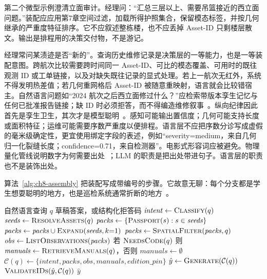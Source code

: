 第二个微型示例澄清立面审计。经理问：``汇总三层以上、需要吊篮接近的西立面问题。''装配应应用第7章空间过滤，加载所得护照集合，保留模态标签，并按几何继承的严重度特征排序。它不应叙述整栋楼，也不应丢掉 Asset-ID 只剩楼层散文。输出是排程用的决策交付物，不是游记。



经理常问某渍迹是否``新的''。查询历史维修记录是决策层的一等能力，也是一等装配意图。跨航次比较需要跨时间同一 Asset-ID、可比的模态覆盖、可用时的既往观测 ID 或工单链接，以及对缺失既往记录的显式处理。若上一航次无红外，系统不得发明热差值；若几何重网格后 Asset-ID 被随意重映射，语言就会比较错宿主。自然语言问题如``2024 航次之后西立面修过什么？''应检索带版本孪生记忆与任何已批准报告链接；缺 ID 时必须拒答，而不得编造维修叙事~\cite{zhang2025,yang2025detreconreg,chen2023facility}。纵向纪律因此首先是孪生卫生，其次才是模型聪明~\cite{zhang2025,yang2025detreconreg,zhao2026physical}。感知可能输出置信度；几何可能支持长度或面积特征；运维可能需要序数严重度以便排程。语言层不应把序数分诊写成虚假的毫米级确定性，更宜使用绑定字段的表述，例如``severity=medium，来自几何归一化裂缝长度；confidence=0.71，来自检测器''。电影式形容词应被避免。物理量化管线说明数字为何需要出处~\cite{zhao2024facade,zhao2026physical}；LLM 的职责是把出处带进句子。语言层的职责也不是装饰出处。

算法~\ref{alg:ch8-assembly} 把装配写成带编号的步骤。它故意无聊：每个分支都是学生想耍聪明的地方，也是巡检系统通常折断的地方~\cite{lewis2020,peng2024,jeon2025hybridrag}。

\begin{algorithm}[htbp]
\caption{面向接地巡检答案的意图条件孪生装配。}
\label{alg:ch8-assembly}
\begin{algorithmic}[1]
\Require 自然语言查询 $q$
\Ensure 草稿答案，或结构化拒答码
\State $\mathit{intent} \gets \textsc{Classify}(q)$
\State $\mathit{seeds} \gets \textsc{ResolveAssets}(q)$ 
\State $\mathit{packs} \gets \{\textsc{Passport}(s): s\in\mathit{seeds}\}$
  \State $\mathit{packs} \gets \mathit{packs}\cup\textsc{Expand}(\mathit{seeds},k{=}1)$
\EndIf
{}
  \State $\mathit{packs} \gets \textsc{SpatialFilter}(\mathit{packs},q)$
\EndIf
\State $\mathit{obs} \gets \textsc{ListObservations}(\mathit{packs})$
\State 若 $\textsc{NeedsCode}(q)$ 则 $\mathit{manuals} \gets \textsc{RetrieveManuals}(q)$，否则 $\mathit{manuals} \gets \emptyset$
\State $\mathcal{C}(q) \gets \{\mathit{intent},\mathit{packs},\mathit{obs},\mathit{manuals},\mathit{edition\_pin}\}$
\State $\hat{y} \gets \textsc{Generate}(\mathcal{C}(q))$ 
\State $\textsc{ValidateIDs}(\hat{y},\mathcal{C}(q))$ 
\State \Return $\hat{y}$
\end{algorithmic}
\end{algorithm}

